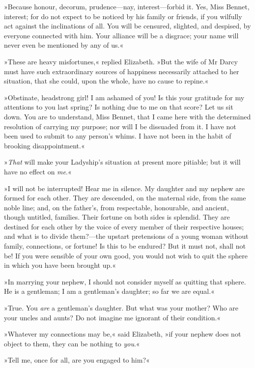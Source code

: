 »Because honour, decorum, prudence—nay, interest—forbid it. Yes, Miss Bennet, interest; for do not expect to be noticed by his family or friends, if you wilfully act against the inclinations of all. You will be censured, slighted, and despised, by everyone connected with him. Your alliance will be a disgrace; your name will never even be mentioned by any of us.«

»These are heavy misfortunes,« replied Elizabeth. »But the wife of Mr Darcy must have such extraordinary sources of happiness necessarily attached to her situation, that she could, upon the whole, have no cause to repine.«

»Obstinate, headstrong girl! I am ashamed of you! Is this your gratitude for my attentions to you last spring? Is nothing due to me on that score? Let us sit down. You are to understand, Miss Bennet, that I came here with the determined resolution of carrying my purpose; nor will I be dissuaded from it. I have not been used to submit to any person's whims. I have not been in the habit of brooking disappointment.«

»\textit{That} will make your Ladyship's situation at present more pitiable; but it will have no effect on \textit{me}.«

»I will not be interrupted! Hear me in silence. My daughter and my nephew are formed for each other. They are descended, on the maternal side, from the same noble line; and, on the father's, from respectable, honourable, and ancient, though untitled, families. Their fortune on both sides is splendid. They are destined for each other by the voice of every member of their respective houses; and what is to divide them?—the upstart pretensions of a young woman without family, connections, or fortune! Is this to be endured? But it must not, shall not be! If you were sensible of your own good, you would not wish to quit the sphere in which you have been brought up.«

»In marrying your nephew, I should not consider myself as quitting that sphere. He is a gentleman; I am a gentleman's daughter; so far we are equal.«

»True. You \textit{are} a gentleman's daughter. But what was your mother? Who are your uncles and aunts? Do not imagine me ignorant of their condition.«

»Whatever my connections may be,« said Elizabeth, »if your nephew does not object to them, they can be nothing to \textit{you}.«

»Tell me, once for all, are you engaged to him?«

